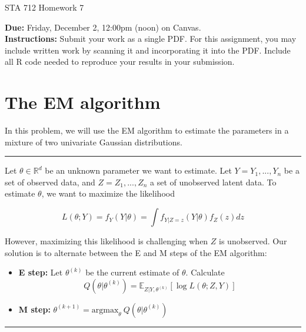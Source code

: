 \documentclass[11pt]{article}
\begin{document}
\begin{center}
\Large
STA 712 Homework 7\\
\normalsize
\vspace{5mm}
\end{center}

\noindent \textbf{Due:} Friday, December 2, 12:00pm (noon) on Canvas.\\ 

\noindent \textbf{Instructions:} Submit your work as a single PDF. For this assignment, you may include written work by scanning it and incorporating it into the PDF. Include all R code needed to reproduce your results in your submission.

\section*{The EM algorithm}

In this problem, we will use the EM algorithm to estimate the parameters in a mixture of two univariate Gaussian distributions.\\

\noindent \rule{\textwidth}{1pt}


\noindent Let $\theta \in \mathbb{R}^d$ be an unknown parameter we want to estimate. Let $Y = Y_1,...,Y_n$ be a set of observed data, and $Z = Z_1,...,Z_n$ a set of unobserved latent data. To estimate $\theta$, we want to maximize the likelihood

$$L(\theta; Y) = f_Y(Y|\theta) = \int f_{Y|Z=z}(Y|\theta) f_Z(z) dz$$

\noindent However, maximizing this likelihood is challenging when $Z$ is unobserved. Our solution is to alternate between the E and M steps of the EM algorithm:

\begin{itemize}
\item[]\textbf{E step:} Let $\theta^{(k)}$ be the current estimate of $\theta$. Calculate
$$Q(\theta | \theta^{(k)}) = \mathbb{E}_{Z|Y, \theta^{(k)}} [\log L(\theta; Z, Y)]$$

\item[] \textbf{M step:} $\theta^{(k+1)} = \text{argmax}_\theta \ Q(\theta | \theta^{(k)})$
\end{itemize}

\noindent \rule{\textwidth}{1pt}
\end{document}
